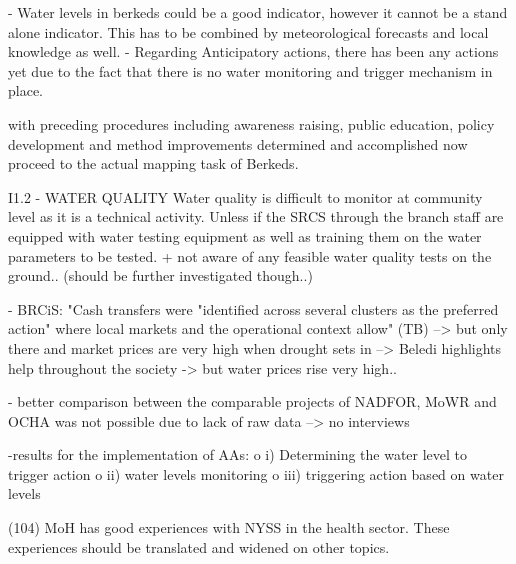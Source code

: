 -	Water levels in berkeds could be a good indicator, however it cannot be a stand alone indicator. This has to be combined by meteorological forecasts and local knowledge as well.
- Regarding Anticipatory actions, there has been any actions yet due to the fact that there is no water monitoring and trigger mechanism in place.


with preceding procedures including awareness raising, public education, policy development and method improvements determined and accomplished now proceed to the actual mapping task of Berkeds.

I1.2
- WATER QUALITY
Water quality is difficult to monitor at community level as it is a technical activity. Unless if the SRCS through the branch staff are equipped with water testing equipment as well as training them on the water parameters to be tested.
+ not aware of any feasible water quality tests on the ground.. (should be further investigated though..)







- BRCiS: "Cash transfers were "identified across several clusters as the preferred action" where local markets and the operational context allow" (TB) --> but only there and market prices are very high when drought sets in
--> Beledi highlights help throughout the society -> but water prices rise very high.. 


- better comparison between the comparable projects of NADFOR, MoWR and OCHA was not possible due to lack of raw data --> no interviews

-results for the implementation of AAs:
o	i) Determining the water level to trigger action
o	ii) water levels monitoring
o	iii) triggering action based on water levels

(104) MoH has good experiences with NYSS in the health sector. These experiences should be translated and widened on other topics.



